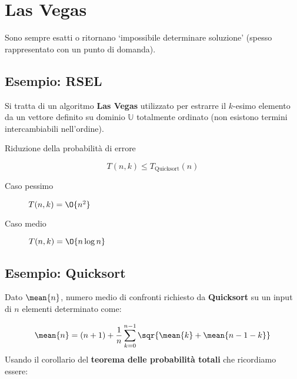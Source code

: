 \documentclass[\main/main.tex]{subfiles}
\begin{document}
\section{Las Vegas}
Sono sempre esatti o ritornano `impossibile determinare soluzione' (spesso rappresentato con un punto di domanda).

\subsection{Esempio: RSEL}
Si tratta di un algoritmo \textbf{Las Vegas} utilizzato per estrarre il \(k\)-esimo elemento da un vettore definito su dominio \(\mathbb{U}\) totalmente ordinato (non esistono termini intercambiabili nell'ordine).

\IncMargin{1em}
\begin{algorithm}
	\BlankLine
	\caption{Riduzione della probabilità di errore}
\end{algorithm}\DecMargin{1em}

\[
	T(n,k) \leq T_{\text{Quicksort}}(n)
\]
\begin{description}
	\item[Caso pessimo] \(T(n,k) = \O{n^2}\)
	\item[Caso medio] \(T(n,k) = \O{n\log{n}}\)
\end{description}

\subsection{Esempio: Quicksort}
Dato \(\mean{n}\), numero medio di confronti richiesto da \textbf{Quicksort} su un input di \(n\) elementi determinato come:

\[
	\mean{n} = (n+1) + \frac{1}{n}\sum_{k=0}^{n-1} \sqr{\mean{k} + \mean{n-1-k}}
\]
Usando il corollario del \textbf{teorema delle probabilità totali} che ricordiamo essere:
\end{document}
